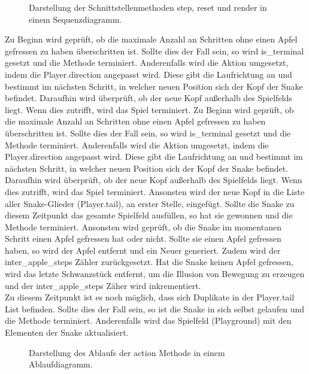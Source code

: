 \begin{figure}[H]
	\centering
	
	\caption[Darstellung der Schnittstellenmethoden in einem Sequenzdiagramm]{Darstellung der Schnittstellenmethoden step, reset und render in einem Sequenzdiagramm.}
	\label{fig:Implementierung_Sequenzdiagram}
\end{figure}
Zu Beginn wird geprüft, ob die maximale Anzahl an Schritten ohne einen Apfel gefressen zu haben überschritten ist. Sollte dies der Fall sein, so wird is\_terminal gesetzt und die Methode terminiert. Anderenfalls wird die Aktion umgesetzt, indem die Player.direction angepasst wird. Diese gibt die Laufrichtung an und bestimmt im nächsten Schritt, in welcher neuen Position sich der Kopf der Snake befindet. Daraufhin wird überprüft, ob der neue Kopf außerhalb des Spielfelds liegt. Wenn dies zutrifft, wird das Spiel terminiert.
Zu Beginn wird geprüft, ob die maximale Anzahl an Schritten ohne einen Apfel gefressen zu haben überschritten ist. Sollte dies der Fall sein, so wird is\_terminal gesetzt und die Methode terminiert. Anderenfalls wird die Aktion umgesetzt, indem die Player.direction angepasst wird. Diese gibt die Laufrichtung an und bestimmt im nächsten Schritt, in welcher neuen Position sich der Kopf der Snake befindet. Daraufhin wird überprüft, ob der neue Kopf außerhalb des Spielfelds liegt. Wenn dies zutrifft, wird das Spiel terminiert.
Ansonsten wird der neue Kopf in die Liste aller Snake-Glieder (Player.tail), an erster Stelle, eingefügt. Sollte die Snake zu diesem Zeitpunkt das gesamte Spielfeld ausfüllen, so hat sie gewonnen und die Methode terminiert. Ansonsten wird geprüft, ob die Snake im momentanen Schritt einen Apfel gefressen hat oder nicht. Sollte sie einen Apfel gefressen haben, so wird der Apfel entfernt und ein Neuer generiert. Zudem wird der inter\_apple\_steps Zähler zurückgesetzt. Hat die Snake keinen Apfel gefressen, wird das letzte Schwanzstück entfernt, um die Illusion von Bewegung zu erzeugen und der inter\_apple\_steps Zäher wird inkrementiert.\\
Zu diesem Zeitpunkt ist es noch möglich, dass sich Duplikate in der Player.tail List befinden. Sollte dies der Fall sein, so ist die Snake in sich selbst gelaufen und die Methode terminiert. Anderenfalls wird das Spielfeld (Playground) mit den Elementen der Snake aktualisiert.
\begin{figure}[H]
	\centering
	
	\caption[Ablaufdiagramm der action Methode]{Darstellung des Ablaufs der action Methode in einem Ablaufdiagramm.}
	\label{fig:Implementierung_action_method}
\end{figure}

